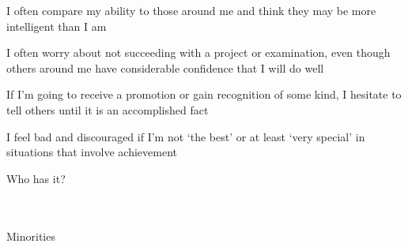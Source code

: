 \documentclass[aspectratio=169]{beamer}
\begin{document}
\begin{frame}
  \begin{center}
    \Huge     I often compare my ability to those around me and think they may be more intelligent than I am
  \end{center}
\end{frame}

\begin{frame}
  \begin{center}
    \Huge      I often worry about not succeeding with a project or examination, even though others around me have considerable
confidence that I will do well
\end{center}
\end{frame}

\begin{frame}
  \begin{center}
    \Huge       If  I’m  going  to  receive  a  promotion  or  gain  recognition  of  some  kind,  I  hesitate  to  tell  others  until  it  is  an
  accomplished fact
\end{center}
\end{frame}

\begin{frame}
  \begin{center}
    \Huge  I  feel  bad  and  discouraged  if  I’m  not  `the  best'  or  at  least  `very  special'  in  situations  that  involve  achievement
\end{center}
\end{frame}

\begin{frame}
  \begin{center}
    \Huge Who has it?
    \\ \small \cite{clanceimes78}
    \\ \small \cite{attr98}
    \\ \small \cite{colour}
  \end{center}
\end{frame}

\begin{frame}
  \begin{center}
    \Huge Minorities
    \\ \small \cite{apa13}
  \end{center}
\end{frame}
\end{document}
